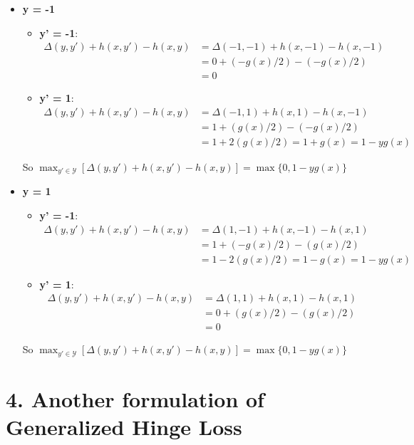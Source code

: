 \documentclass[paper=a4, fontsize=11pt]{scrartcl} %
\numberwithin{equation}{section} %
\numberwithin{figure}{section} %
\numberwithin{table}{section} %
\begin{document}
\begin{itemize}
\item \textbf{y = -1}
\begin{itemize}
\item \textbf{y' = -1}:
\begin{align*}
\Delta(y, y') + h(x, y') - h(x,y) &= \Delta(-1, -1) + h(x, -1) - h(x,-1) \\
	&= 0 + (-g(x)/2) - (-g(x)/2) \\
	&= 0
\end{align*}
\item \textbf{y' = 1}:
\begin{align*}
\Delta(y, y') + h(x, y') - h(x,y) &= \Delta(-1, 1) + h(x, 1) - h(x,-1) \\
	&= 1 + (g(x)/2) - (-g(x)/2) \\
	&= 1 + 2(g(x)/2) = 1 + g(x) = 1 - y g(x)
\end{align*}
\end{itemize}
So $\max_{y' \in \mathcal{Y}}[\Delta(y,y') + h(x, y') - h(x,y)] = \max\{0, 1 - yg(x)\}$

\item \textbf{y = 1}
\begin{itemize}
\item \textbf{y' = -1}:
\begin{align*}
\Delta(y, y') + h(x, y') - h(x,y) &= \Delta(1, -1) + h(x, -1) - h(x,1) \\
	&= 1 + (-g(x)/2) - (g(x)/2) \\
	&= 1 - 2(g(x)/2) = 1 - g(x) = 1 - y g(x)
\end{align*}
\item \textbf{y' = 1}:
\begin{align*}
\Delta(y, y') + h(x, y') - h(x,y) &= \Delta(1, 1) + h(x, 1) - h(x,1) \\
	&= 0 + (g(x)/2) - (g(x)/2) \\
	&= 0 
\end{align*}
\end{itemize}
So $\max_{y' \in \mathcal{Y}}[\Delta(y,y') + h(x, y') - h(x,y)] = \max\{0, 1 - yg(x)\}$
\end{itemize}



\section*{4. Another formulation of Generalized Hinge Loss}
\end{document}
